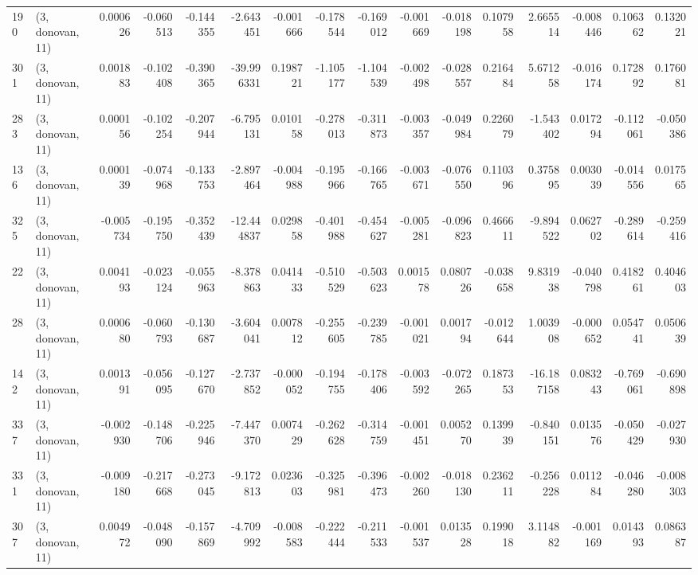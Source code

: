 \begin{tabular}{llrrrrrrrrrrrrrr}
190 &  (3, donovan, 11) &   0.000626 & -0.060513 & -0.144355 &   -2.643451 & -0.001666 &  -0.178544 & -0.169012 & -0.001669 & -0.018198 &  0.107958 &     2.665514 & -0.008446 &  0.106362 &  0.132021 \\
301 &  (3, donovan, 11) &   0.001883 & -0.102408 & -0.390365 &  -39.996331 &  0.198721 &  -1.105177 & -1.104539 & -0.002498 & -0.028557 &  0.216484 &     5.671258 & -0.016174 &  0.172892 &  0.176081 \\
283 &  (3, donovan, 11) &   0.000156 & -0.102254 & -0.207944 &   -6.795131 &  0.010158 &  -0.278013 & -0.311873 & -0.003357 & -0.049984 &  0.226079 &    -1.543402 &  0.017294 & -0.112061 & -0.050386 \\
136 &  (3, donovan, 11) &   0.000139 & -0.074968 & -0.133753 &   -2.897464 & -0.004988 &  -0.195966 & -0.166765 & -0.003671 & -0.076550 &  0.110396 &     0.375895 &  0.003039 & -0.014556 &  0.017565 \\
325 &  (3, donovan, 11) &  -0.005734 & -0.195750 & -0.352439 &  -12.444837 &  0.029858 &  -0.401988 & -0.454627 & -0.005281 & -0.096823 &  0.466611 &    -9.894522 &  0.062702 & -0.289614 & -0.259416 \\
22  &  (3, donovan, 11) &   0.004193 & -0.023124 & -0.055963 &   -8.378863 &  0.041433 &  -0.510529 & -0.503623 &  0.001578 &  0.080726 & -0.038658 &     9.831938 & -0.040798 &  0.418261 &  0.404603 \\
28  &  (3, donovan, 11) &   0.000680 & -0.060793 & -0.130687 &   -3.604041 &  0.007812 &  -0.255605 & -0.239785 & -0.001021 &  0.001794 & -0.012644 &     1.003908 & -0.000652 &  0.054741 &  0.050639 \\
142 &  (3, donovan, 11) &   0.001391 & -0.056095 & -0.127670 &   -2.737852 & -0.000052 &  -0.194755 & -0.178406 & -0.003592 & -0.072265 &  0.187353 &   -16.187158 &  0.083243 & -0.769061 & -0.690898 \\
337 &  (3, donovan, 11) &  -0.002930 & -0.148706 & -0.225946 &   -7.447370 &  0.007429 &  -0.262628 & -0.314759 & -0.001451 &  0.005270 &  0.139939 &    -0.840151 &  0.013576 & -0.050429 & -0.027930 \\
331 &  (3, donovan, 11) &  -0.009180 & -0.217668 & -0.273045 &   -9.172813 &  0.023603 &  -0.325981 & -0.396473 & -0.002260 & -0.018130 &  0.236211 &    -0.256228 &  0.011284 & -0.046280 & -0.008303 \\
307 &  (3, donovan, 11) &   0.004972 & -0.048090 & -0.157869 &   -4.709992 & -0.008583 &  -0.222444 & -0.211533 & -0.001537 &  0.013528 &  0.199018 &     3.114882 & -0.001169 &  0.014393 &  0.086387 \\

\end{tabular}
